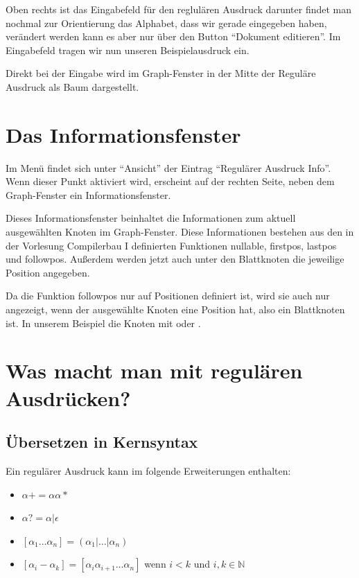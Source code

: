 Oben rechts ist das Eingabefeld für den reglulären Ausdruck darunter findet man nochmal zur Orientierung das Alphabet, dass wir gerade eingegeben haben, verändert werden kann es aber nur über den Button "`Dokument editieren"'. Im Eingabefeld tragen wir nun unseren Beispielausdruck  ein.\vspace{10pt}

Direkt bei der Eingabe wird im Graph-Fenster in der Mitte der Reguläre Ausdruck als Baum dargestellt.

\section{Das Informationsfenster}

Im Menü findet sich unter "`Ansicht"' der Eintrag "`Regulärer Ausdruck Info"'. Wenn dieser Punkt aktiviert wird, erscheint auf der rechten Seite, neben dem Graph-Fenster ein Informationsfenster.

Dieses Informationsfenster beinhaltet die Informationen zum aktuell ausgewählten Knoten im Graph-Fenster. Diese Informationen bestehen aus den in der Vorlesung Compilerbau I definierten Funktionen nullable, firstpos, lastpos und followpos. Außerdem werden jetzt auch unter den Blattknoten die jeweilige Position angegeben.

Da die Funktion followpos nur auf Positionen definiert ist, wird sie auch nur angezeigt, wenn der ausgewählte Knoten eine Position hat, also ein Blattknoten ist. In unserem Beispiel die Knoten mit  oder .

\section{Was macht man mit regulären Ausdrücken?}

\subsection{Übersetzen in Kernsyntax}

Ein regulärer Ausdruck kann im \gtitool folgende Erweiterungen enthalten:

\begin{itemize}
  \item $\alpha+ = \alpha \alpha*$
  \item $\alpha? = \alpha|\epsilon$
  \item $[\alpha _1\ldots\alpha _n] = (\alpha _1|\ldots|\alpha _n)$
  \item $[\alpha _i - \alpha _k] = [\alpha _i \alpha _{i+1}\ldots\alpha _n]$ wenn $i < k$ und $i,k\in{\mathbb N}$
\end{itemize}

